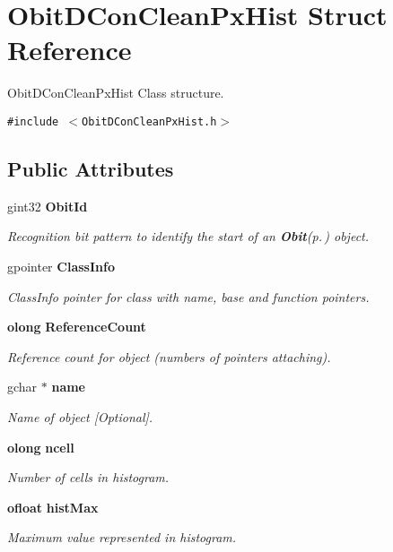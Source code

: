 \section{Obit\-DCon\-Clean\-Px\-Hist Struct Reference}
\label{structObitDConCleanPxHist}
Obit\-DCon\-Clean\-Px\-Hist Class structure.  


{\tt \#include $<$Obit\-DCon\-Clean\-Px\-Hist.h$>$}

\subsection*{Public Attributes}
\begin{CompactItemize}
\item 
gint32 {\bf Obit\-Id}
\begin{CompactList}\small\item\em Recognition bit pattern to identify the start of an {\bf Obit}{\rm (p.\,\pageref{structObit})} object. \item\end{CompactList}\item 
gpointer {\bf Class\-Info}
\begin{CompactList}\small\item\em Class\-Info pointer for class with name, base and function pointers. \item\end{CompactList}\item 
{\bf olong} {\bf Reference\-Count}
\begin{CompactList}\small\item\em Reference count for object (numbers of pointers attaching). \item\end{CompactList}\item 
gchar $\ast$ {\bf name}
\begin{CompactList}\small\item\em Name of object [Optional]. \item\end{CompactList}\item 
{\bf olong} {\bf ncell}
\begin{CompactList}\small\item\em Number of cells in histogram. \item\end{CompactList}\item 
{\bf ofloat} {\bf hist\-Max}
\begin{CompactList}\small\item\em Maximum value represented in histogram. \item\end{CompactList}\item 

\end{CompactItemize}
